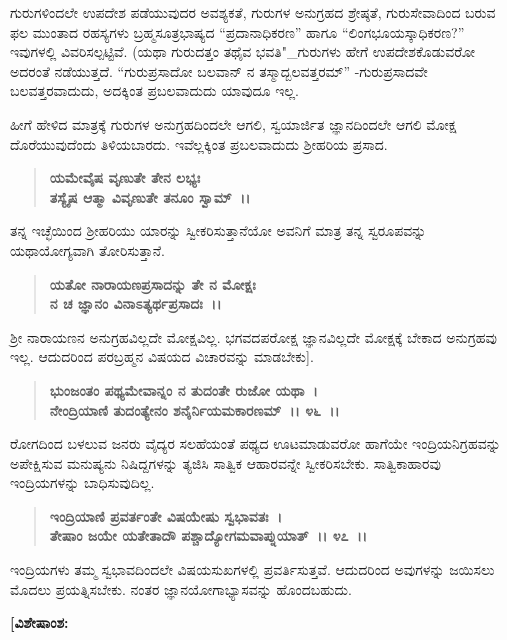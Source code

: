 ಗುರುಗಳಿಂದಲೇ ಉಪದೇಶ ಪಡೆಯುವುದರ ಅವಶ್ಯಕತೆ, ಗುರುಗಳ ಅನುಗ್ರಹದ ಶ್ರೇಷ್ಠತೆ, ಗುರುಸೇವಾದಿಂದ ಬರುವ ಫಲ ಮುಂತಾದ ರಹಸ್ಯಗಳು ಬ್ರಹ್ಮಸೂತ್ರಭಾಷ್ಯದ “ಪ್ರದಾನಾಧಿಕರಣ” ಹಾಗೂ “ಲಿಂಗಭೂಯಸ್ಕಾಧಿಕರಣ?” ಇವುಗಳಲ್ಲಿ ವಿವರಿಸಲ್ಪಟ್ಟಿವೆ. (ಯಥಾ ಗುರುದತ್ತಂ ತಥೈವ ಭವತಿ"\_ಗುರುಗಳು ಹೇಗೆ ಉಪದೇಶಕೊಡುವರೋ ಅದರಂತೆ ನಡೆಯುತ್ತದೆ. “ಗುರುಪ್ರಸಾದೋ ಬಲವಾನ್ ನ ತಸ್ಮಾದ್ಬಲವತ್ತರಮ್” -ಗುರುಪ್ರಸಾದವೇ ಬಲವತ್ತರವಾದುದು, ಅದಕ್ಕಿಂತ ಪ್ರಬಲವಾದುದು ಯಾವುದೂ ಇಲ್ಲ.

ಹೀಗೆ ಹೇಳಿದ ಮಾತ್ರಕ್ಕೆ ಗುರುಗಳ ಅನುಗ್ರಹದಿಂದಲೇ ಆಗಲಿ, ಸ್ವಯಾರ್ಜಿತ ಜ್ಞಾನದಿಂದಲೇ ಆಗಲಿ ಮೋಕ್ಷ ದೊರೆಯುವುದೆಂದು ತಿಳಿಯಬಾರದು. ಇವೆಲ್ಲಕ್ಕಿಂತ ಪ್ರಬಲ\-ವಾದುದು ಶ‍್ರೀಹರಿಯ ಪ್ರಸಾದ.

\begin{verse}
\textbf{ಯಮೇವೈಷ ವೃಣುತೇ ತೇನ ಲಭ್ಯಃ}\\\textbf{ತಸ್ಯೈಷ ಆತ್ಮಾ ವಿವೃಣುತೇ ತನೂಂ ಸ್ವಾಮ್~।।} 
\end{verse}

ತನ್ನ ಇಚ್ಛೆಯಿಂದ ಶ‍್ರೀಹರಿಯು ಯಾರನ್ನು ಸ್ವೀಕರಿಸುತ್ತಾನೆಯೋ ಅವನಿಗೆ ಮಾತ್ರ ತನ್ನ ಸ್ವರೂಪವನ್ನು ಯಥಾಯೋಗ್ಯವಾಗಿ ತೋರಿಸುತ್ತಾನೆ.

\begin{verse}
\textbf{ಯತೋ ನಾರಾಯಣಪ್ರಸಾದನ್ನು ತೇ ನ ಮೋಕ್ಷಃ}\\\textbf{ನ ಚ ಜ್ಞಾನಂ ವಿನಾಽತ್ಯರ್ಥಪ್ರಸಾದಃ~।।} 
\end{verse}

ಶ‍್ರೀ ನಾರಾಯಣನ ಅನುಗ್ರಹವಿಲ್ಲದೇ ಮೋಕ್ಷವಿಲ್ಲ. ಭಗವದಪರೋಕ್ಷ ಜ್ಞಾನವಿಲ್ಲದೇ ಮೋಕ್ಷಕ್ಕೆ ಬೇಕಾದ ಅನುಗ್ರಹವು ಇಲ್ಲ. ಆದುದರಿಂದ ಪರಬ್ರಹ್ಮನ ವಿಷಯದ ವಿಚಾರವನ್ನು ಮಾಡಬೇಕು].

\begin{verse}
\textbf{ಭುಂಜಂತಂ ಪಥ್ಯಮೇವಾನ್ನಂ ನ ತುದಂತೇ ರುಜೋ ಯಥಾ~।}\\\textbf{ನೇಂದ್ರಿಯಾಣಿ ತುದಂತ್ಯೇನಂ ಶನೈರ್ನಿಯಮಕಾರಣಮ್~।। ೪೬~।।}
\end{verse}

ರೋಗದಿಂದ ಬಳಲುವ ಜನರು ವೈದ್ಯರ ಸಲಹೆಯಂತೆ ಪಥ್ಯದ ಊಟಮಾಡುವರೋ ಹಾಗೆಯೇ ಇಂದ್ರಿಯನಿಗ್ರಹವನ್ನು ಅಪೇಕ್ಷಿಸುವ ಮನುಷ್ಯನು ನಿಷಿದ್ದಗಳನ್ನು ತ್ಯಜಿಸಿ ಸಾತ್ವಿಕ ಆಹಾರವನ್ನೇ ಸ್ವೀಕರಿಸಬೇಕು. ಸಾತ್ವಿಕಾಹಾರವು ಇಂದ್ರಿಯಗಳನ್ನು ಬಾಧಿಸುವುದಿಲ್ಲ.

\begin{verse}
\textbf{ಇಂದ್ರಿಯಾಣಿ ಪ್ರವರ್ತಂತೇ ವಿಷಯೇಷು ಸ್ವಭಾವತಃ~।}\\\textbf{ತೇಷಾಂ ಜಯೇ ಯತೇತಾದೌ ಪಶ್ಚಾದ್ಯೋಗಮವಾಪ್ನುಯಾತ್~।। ೪೭~।।}
\end{verse}

ಇಂದ್ರಿಯಗಳು ತಮ್ಮ ಸ್ವಭಾವದಿಂದಲೇ ವಿಷಯಸುಖಗಳಲ್ಲಿ ಪ್ರವರ್ತಿಸುತ್ತವೆ. ಆದುದರಿಂದ ಅವುಗಳನ್ನು ಜಯಿಸಲು ಮೊದಲು ಪ್ರಯತ್ನಿಸಬೇಕು. ನಂತರ ಜ್ಞಾನಯೋಗಾಭ್ಯಾಸವನ್ನು ಹೊಂದಬಹುದು.

\begin{flushleft}
\textbf{[ವಿಶೇಷಾಂಶ:}
\end{flushleft}


